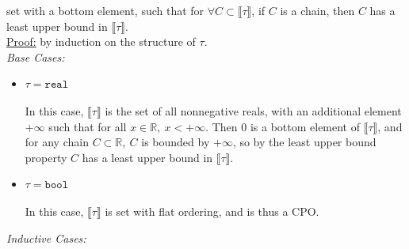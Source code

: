 \documentclass{westhesis}
\newcommand{\R}{\mathbb{R}}
\begin{document}
set with a bottom element, such that for $\forall C \subset \llbracket \tau \rrbracket$, if  $C$ is a chain, then $C$ has a least 
upper bound in $\llbracket \tau \rrbracket$. \\
\underline{Proof:} by induction on the structure of $\tau$. \\
\emph{Base Cases: }
\begin{itemize}
\item $\tau = \texttt{real}$ \\ \\
In this case, $\llbracket \tau \rrbracket$ is the set of all nonnegative reals, with an additional element $+\infty$ such that for all
$x \in \R, \ x < +\infty$. Then $0$ is a bottom element of $\llbracket \tau \rrbracket$, and for any chain $C \subset \R, \ C$ is bounded by $+\infty$, so by the least upper bound property $C$ has a least upper bound in $\llbracket \tau \rrbracket$.
\item $\tau = \texttt{bool}$ \\ \\
In this case, $\llbracket \tau \rrbracket$ is set with flat ordering, and is thus a CPO. \\ 
\end{itemize}
\emph{Inductive Cases: }
\end{document}
